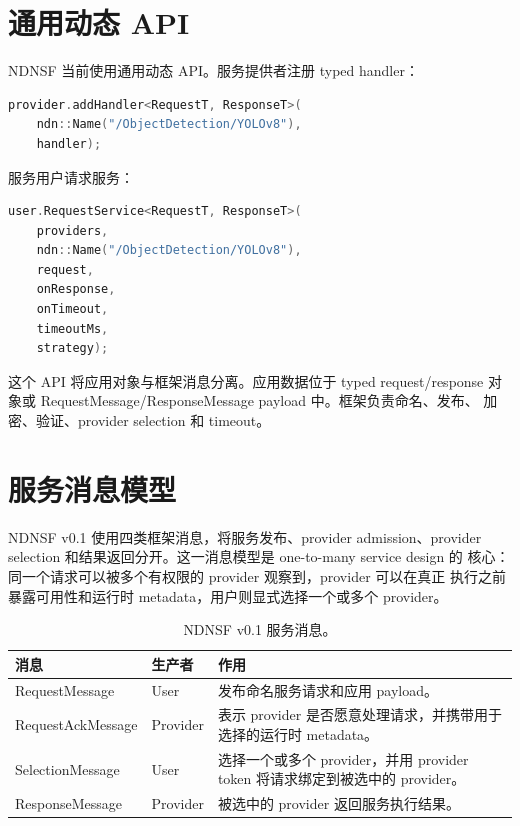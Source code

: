 \section{通用动态 API}

NDNSF 当前使用通用动态 API。服务提供者注册 typed handler：

\begin{lstlisting}[language=C++]
provider.addHandler<RequestT, ResponseT>(
    ndn::Name("/ObjectDetection/YOLOv8"),
    handler);
\end{lstlisting}

服务用户请求服务：

\begin{lstlisting}[language=C++]
user.RequestService<RequestT, ResponseT>(
    providers,
    ndn::Name("/ObjectDetection/YOLOv8"),
    request,
    onResponse,
    onTimeout,
    timeoutMs,
    strategy);
\end{lstlisting}

这个 API 将应用对象与框架消息分离。应用数据位于 typed request/response
对象或 RequestMessage/ResponseMessage payload 中。框架负责命名、发布、
加密、验证、provider selection 和 timeout。

\section{服务消息模型}

NDNSF v0.1 使用四类框架消息，将服务发布、provider admission、provider
selection 和结果返回分开。这一消息模型是 one-to-many service design 的
核心：同一个请求可以被多个有权限的 provider 观察到，provider 可以在真正
执行之前暴露可用性和运行时 metadata，用户则显式选择一个或多个 provider。

\begin{table}[H]
\centering
\caption{NDNSF v0.1 服务消息。}
\label{tab:ndnsf-message-model-ch}
\begin{tabularx}{\textwidth}{p{}p{}X}
\toprule
消息 & 生产者 & 作用 \\
\midrule
RequestMessage & User & 发布命名服务请求和应用 payload。 \\
RequestAckMessage & Provider & 表示 provider 是否愿意处理请求，并携带用于
选择的运行时 metadata。 \\
SelectionMessage & User & 选择一个或多个 provider，并用 provider token
将请求绑定到被选中的 provider。 \\
ResponseMessage & Provider & 被选中的 provider 返回服务执行结果。 \\
\bottomrule
\end{tabularx}
\end{table}

